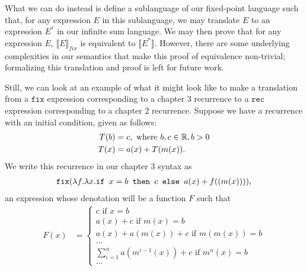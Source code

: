 What we can do instead is define a sublanguage of our fixed-point language such that, for any expression $E$ in this 
sublanguage, we may translate $E$ to an expression $E^*$ in our infinite sum language. We may then prove
that for any expression $E$, $\llbracket E \rrbracket_{fix}$ is equivalent to $\llbracket E^* \rrbracket$. However,
there are some underlying complexities in our semantics that make this proof of equivalence non-trivial; formalizing
this translation and proof is left for future work.

Still, we can look at an example of what it might look like to make a translation from a $\texttt{fix}$ expression corresponding to a chapter 3 recurrence to a $\texttt{rec}$ expression corresponding to a chapter 2 recurrence.
Suppose we have a recurrence with an initial condition, given as follows:
\begin{align*}
T(b) &= c, \text{ where } b, c  \in \mathbb{R}, b > 0 \\
T(x) &= a(x) + T( m(x) ).
\end{align*}
We write this recurrence in our chapter 3 syntax as 
\begin{align*}
\texttt{fix}(\lambda f.\lambda x. \texttt{if } x = b \texttt{ then } c \texttt{ else } a(x) + f((m(x)))),
\end{align*}
an expression whose denotation will be a function $F$ such that
\begin{align*}
F(x) &=
\begin{cases}
c \text{ if } x  = b \\
a(x) + c \text{ if } m(x)  = b \\
a(x) + a(m(x)) + c \text{ if } m(m(x))  = b \\
\ldots \\
\sum_{i=1}^{n} a(m^{i-1}(x)) + c \text{ if } m^n(x) = b \\
\ldots
\end{cases}
\end{align*}

